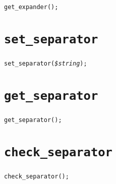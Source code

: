 \documentclass[a4paper,10pt]{report}
\begin{document}
\begin{boxnote}
\begin{alltt}
get_expander();
\end{alltt}
\end{boxnote}
\vspace{\baselineskip}

\section{\texttt{set\_separator}}

\subsubsection{\format}

\begin{boxnote}
\begin{alltt}
set_separator(\textit{\$string});
\end{alltt}
\end{boxnote}
\vspace{\baselineskip}

\section{\texttt{get\_separator}}

\subsubsection{\format}

\begin{boxnote}
\begin{alltt}
get_separator();
\end{alltt}
\end{boxnote}
\vspace{\baselineskip}

\section{\texttt{check\_separator}}

\subsubsection{\format}

\begin{boxnote}
\begin{alltt}
check_separator();
\end{alltt}
\end{boxnote}
\vspace{\baselineskip}
\end{document}
